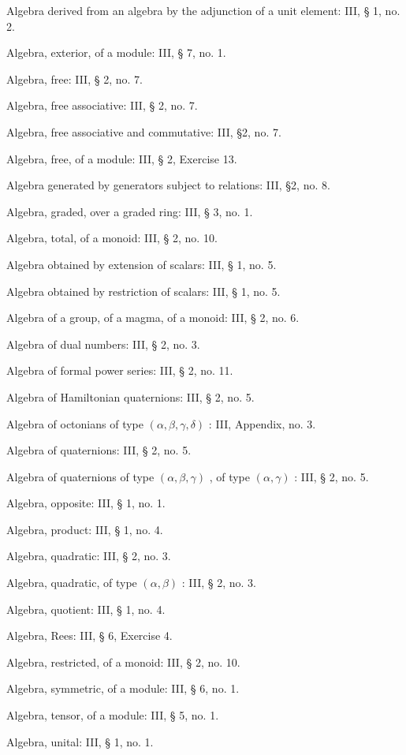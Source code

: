 Algebra derived from an algebra by the adjunction of a unit element: III, § 1, no. 2.

Algebra, exterior, of a module: III, § 7, no. 1.

Algebra, free: III, § 2, no. 7.

Algebra, free associative: III, § 2, no. 7.

Algebra, free associative and commutative: III, §2, no. 7.

Algebra, free, of a module: III, § 2, Exercise 13.

Algebra generated by generators subject to relations: III, §2, no. 8.

Algebra, graded, over a graded ring: III, § 3, no. 1.

Algebra, total, of a monoid: III, § 2, no. 10.

Algebra obtained by extension of scalars: III, § 1, no. 5.

Algebra obtained by restriction of scalars: III, § 1, no. 5.

Algebra of a group, of a magma, of a monoid: III, § 2, no. 6.

Algebra of dual numbers: III, § 2, no. 3.

Algebra of formal power series: III, § 2, no. 11.

Algebra of Hamiltonian quaternions: III, § 2, no. 5.

Algebra of octonians of type \((\alpha, \beta, \gamma, \delta)\) : III, Appendix, no. 3.

Algebra of quaternions: III, § 2, no. 5.

Algebra of quaternions of type \((\alpha, \beta, \gamma)\) , of type \((\alpha, \gamma)\) : III, § 2, no. 5.

Algebra, opposite: III, § 1, no. 1.

Algebra, product: III, § 1, no. 4.

Algebra, quadratic: III, § 2, no. 3.

Algebra, quadratic, of type \((\alpha, \beta)\) : III, § 2, no. 3.

Algebra, quotient: III, § 1, no. 4.

Algebra, Rees: III, § 6, Exercise 4.

Algebra, restricted, of a monoid: III, § 2, no. 10.

Algebra, symmetric, of a module: III, § 6, no. 1.

Algebra, tensor, of a module: III, § 5, no. 1.

Algebra, unital: III, § 1, no. 1.

